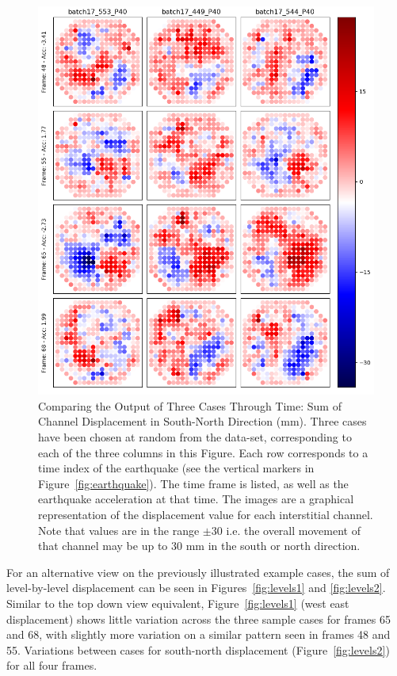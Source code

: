 \begin{figure}[p]
	\centering
	\includegraphics[scale=0.45]{Figures/results2.png}
	\caption{Comparing the Output of Three Cases Through Time: Sum of Channel Displacement in South-North Direction (mm). Three cases have been chosen at random from the data-set, corresponding to each of the three columns in this Figure. Each row corresponds to a time index of the earthquake (see the vertical markers in Figure~\ref{fig:earthquake}). The time frame is listed, as well as the earthquake acceleration at that time. The images are a graphical representation of the displacement value for each interstitial channel. Note that values are in the range $ \pm 30 $ i.e. the overall movement of that channel may be up to 30 mm in the south or north direction.}
	\label{fig:results2}
\end{figure}

\noindent
For an alternative view on the previously illustrated example cases, the sum of level-by-level displacement can be seen in Figures~\ref{fig:levels1} and \ref{fig:levels2}. Similar to the top down view equivalent, Figure~\ref{fig:levels1} (west east displacement) shows little variation across the three sample cases for frames 65 and 68, with slightly more variation on a similar pattern seen in frames 48 and 55. Variations between cases for south-north displacement (Figure~\ref{fig:levels2}) for all four frames.
\\

